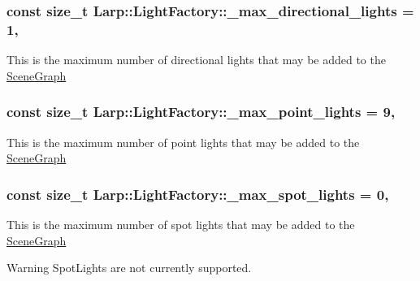 \subsubsection[{\texorpdfstring{\+\_\+max\+\_\+directional\+\_\+lights}{_max_directional_lights}}]{\setlength{\rightskip}{0pt plus 5cm}const size\+\_\+t Larp\+::\+Light\+Factory\+::\+\_\+max\+\_\+directional\+\_\+lights = 1\hspace{0.3cm}{\ttfamily [static]}, {\ttfamily [private]}}\hypertarget{classLarp_1_1LightFactory_a1da82e298c3bedab4b00dbea82639736}{}\label{classLarp_1_1LightFactory_a1da82e298c3bedab4b00dbea82639736}
This is the maximum number of directional lights that may be added to the \hyperlink{classLarp_1_1SceneGraph}{Scene\+Graph} 
\subsubsection[{\texorpdfstring{\+\_\+max\+\_\+point\+\_\+lights}{_max_point_lights}}]{\setlength{\rightskip}{0pt plus 5cm}const size\+\_\+t Larp\+::\+Light\+Factory\+::\+\_\+max\+\_\+point\+\_\+lights = 9\hspace{0.3cm}{\ttfamily [static]}, {\ttfamily [private]}}\hypertarget{classLarp_1_1LightFactory_a5e8f45cac917f264a710251979df9484}{}\label{classLarp_1_1LightFactory_a5e8f45cac917f264a710251979df9484}
This is the maximum number of point lights that may be added to the \hyperlink{classLarp_1_1SceneGraph}{Scene\+Graph} 
\subsubsection[{\texorpdfstring{\+\_\+max\+\_\+spot\+\_\+lights}{_max_spot_lights}}]{\setlength{\rightskip}{0pt plus 5cm}const size\+\_\+t Larp\+::\+Light\+Factory\+::\+\_\+max\+\_\+spot\+\_\+lights = 0\hspace{0.3cm}{\ttfamily [static]}, {\ttfamily [private]}}\hypertarget{classLarp_1_1LightFactory_a81a05e25aac303788b4fe569824263c9}{}\label{classLarp_1_1LightFactory_a81a05e25aac303788b4fe569824263c9}
This is the maximum number of spot lights that may be added to the \hyperlink{classLarp_1_1SceneGraph}{Scene\+Graph} \begin{DoxyWarning}{Warning}
Spot\+Lights are not currently supported. 
\end{DoxyWarning}
